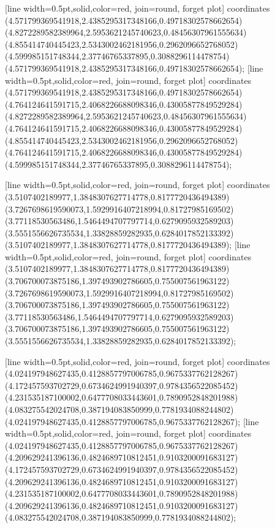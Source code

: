 [line width=0.5pt,solid,color=red, join=round, forget plot] coordinates {(4.571799369541918,2.4385295317348166,0.49718302578662654) (4.8272289582389964,2.5953621245740623,0.48456307961555634) (4.855414740445423,2.5343002462181956,0.2962096652768052) (4.599985151748344,2.37746765337895,0.3088296114478754) (4.571799369541918,2.4385295317348166,0.49718302578662654)};
[line width=0.5pt,solid,color=red, join=round, forget plot] coordinates {(4.571799369541918,2.4385295317348166,0.49718302578662654) (4.764124641591715,2.4068226688098346,0.43005877849529284) (4.8272289582389964,2.5953621245740623,0.48456307961555634) (4.764124641591715,2.4068226688098346,0.43005877849529284) (4.855414740445423,2.5343002462181956,0.2962096652768052) (4.764124641591715,2.4068226688098346,0.43005877849529284) (4.599985151748344,2.37746765337895,0.3088296114478754)};

[line width=0.5pt,solid,color=red, join=round, forget plot] coordinates {(3.5107402189977,1.3848307627714778,0.8177720436494389) (3.7267698619590073,1.5929916407218994,0.81727985169502) (3.77118530563486,1.5464494707797714,0.6279095932589203) (3.5551556626735534,1.33828859282935,0.6284017852133392) (3.5107402189977,1.3848307627714778,0.8177720436494389)};
[line width=0.5pt,solid,color=red, join=round, forget plot] coordinates {(3.5107402189977,1.3848307627714778,0.8177720436494389) (3.706700073875186,1.397493902786605,0.755007561963122) (3.7267698619590073,1.5929916407218994,0.81727985169502) (3.706700073875186,1.397493902786605,0.755007561963122) (3.77118530563486,1.5464494707797714,0.6279095932589203) (3.706700073875186,1.397493902786605,0.755007561963122) (3.5551556626735534,1.33828859282935,0.6284017852133392)};

[line width=0.5pt,solid,color=red, join=round, forget plot] coordinates {(4.024197948627435,0.4128857797006785,0.9675337762128267) (4.172457593702729,0.6734624991940397,0.9784356522085452) (4.231535187100002,0.6477708033443601,0.7890952848201988) (4.083275542024708,0.387194083850999,0.7781934088244802) (4.024197948627435,0.4128857797006785,0.9675337762128267)};
[line width=0.5pt,solid,color=red, join=round, forget plot] coordinates {(4.024197948627435,0.4128857797006785,0.9675337762128267) (4.209629241396136,0.4824689710812451,0.9103200091683127) (4.172457593702729,0.6734624991940397,0.9784356522085452) (4.209629241396136,0.4824689710812451,0.9103200091683127) (4.231535187100002,0.6477708033443601,0.7890952848201988) (4.209629241396136,0.4824689710812451,0.9103200091683127) (4.083275542024708,0.387194083850999,0.7781934088244802)};

